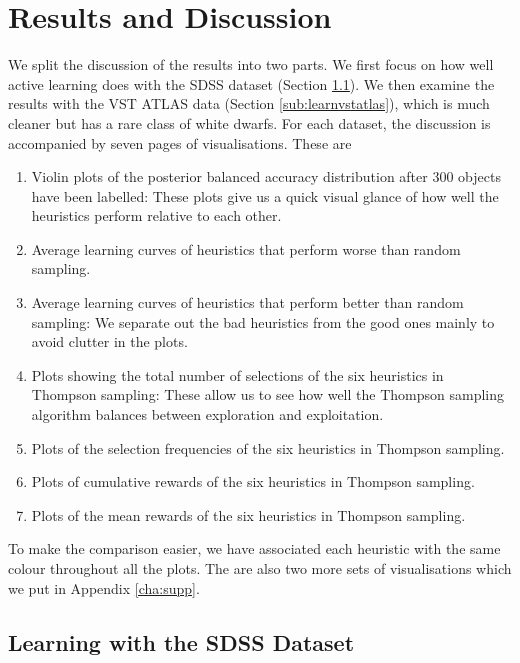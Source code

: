 \section{Results and Discussion}
\label{sec:results2}

We split the discussion of the results into two parts. We first focus on how well active
learning does with the SDSS dataset (Section \ref{sub:learnsdss}). We then examine
the results with the VST ATLAS data (Section \ref{sub:learnvstatlas}), which is much cleaner
but has a rare class of white dwarfs. For each dataset, the discussion is accompanied by
seven pages of visualisations. These are
    \begin{enumerate}
        \item Violin plots of the posterior balanced accuracy distribution after 300 objects 
        have been labelled: These plots give us a quick visual glance of how well the heuristics
        perform relative to each other.
        
        \item Average learning curves of heuristics that perform worse than random sampling.
        
        \item Average learning curves of heuristics that perform better than random sampling: We separate
        out the bad heuristics from the good ones mainly to avoid clutter in the plots.
        
        \item Plots showing the total number of selections of the six heuristics in Thompson sampling:
        These allow us to see how well the Thompson sampling algorithm balances between exploration
        and exploitation.
        
        \item Plots of the selection frequencies of the six heuristics in Thompson sampling.
        
        \item Plots of cumulative rewards of the six heuristics in Thompson sampling.
        
        \item Plots of the mean rewards of the six heuristics in Thompson sampling.
    \end{enumerate}
To make the comparison easier, we have associated each heuristic with the same colour throughout all
the plots. The are also two more sets of visualisations which we put in Appendix \ref{cha:supp}.

\subsection{Learning with the SDSS Dataset}
\label{sub:learnsdss}

